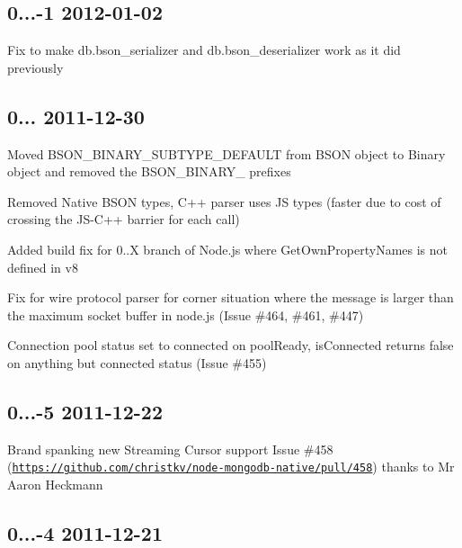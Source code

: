\subsection*{0...-\/1 2012-\/01-\/02 }


\begin{DoxyItemize}
\item Fix to make db.\+bson\+\_\+serializer and db.\+bson\+\_\+deserializer work as it did previously
\end{DoxyItemize}

\subsection*{0... 2011-\/12-\/30 }


\begin{DoxyItemize}
\item Moved B\+S\+O\+N\+\_\+\+B\+I\+N\+A\+R\+Y\+\_\+\+S\+U\+B\+T\+Y\+P\+E\+\_\+\+D\+E\+F\+A\+U\+LT from B\+S\+ON object to Binary object and removed the B\+S\+O\+N\+\_\+\+B\+I\+N\+A\+R\+Y\+\_\+ prefixes
\item Removed Native B\+S\+ON types, C++ parser uses JS types (faster due to cost of crossing the J\+S-\/\+C++ barrier for each call)
\item Added build fix for 0..\+X branch of Node.\+js where Get\+Own\+Property\+Names is not defined in v8
\item Fix for wire protocol parser for corner situation where the message is larger than the maximum socket buffer in node.\+js (Issue \#464, \#461, \#447)
\item Connection pool status set to connected on pool\+Ready, is\+Connected returns false on anything but connected status (Issue \#455)
\end{DoxyItemize}

\subsection*{0...-\/5 2011-\/12-\/22 }


\begin{DoxyItemize}
\item Brand spanking new Streaming Cursor support Issue \#458 (\href{https://github.com/christkv/node-mongodb-native/pull/458}{\tt https\+://github.\+com/christkv/node-\/mongodb-\/native/pull/458}) thanks to Mr Aaron Heckmann
\end{DoxyItemize}

\subsection*{0...-\/4 2011-\/12-\/21 }


